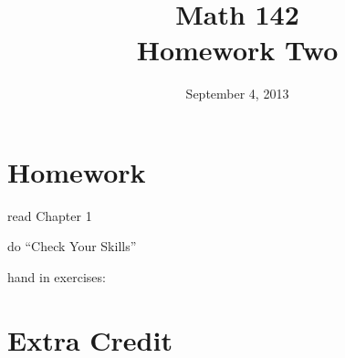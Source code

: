 \documentclass{exam}
\author{}
\date{September 4, 2013}
\title{Math 142 \\ Homework Two}
\begin{document}
  \maketitle

  \section{Homework}
  \begin{itemize*}
    \item read Chapter 1 
    \item do ``Check Your Skills''
    \item hand in exercises: 
  \end{itemize*}

  \section{Extra Credit}

  \ifprintanswers
\end{document}
